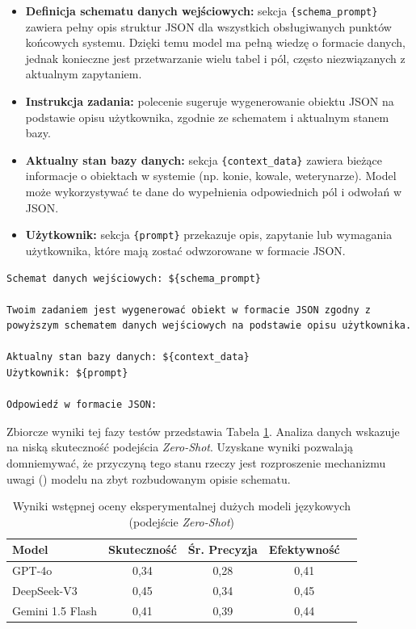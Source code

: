 \begin{itemize}
    \item \textbf{Definicja schematu danych wejściowych:} sekcja \texttt{\{schema\_prompt\}} zawiera pełny opis struktur JSON dla wszystkich obsługiwanych punktów końcowych systemu. Dzięki temu model ma pełną wiedzę o formacie danych, jednak konieczne jest przetwarzanie wielu tabel i pól, często niezwiązanych z aktualnym zapytaniem.
    \item \textbf{Instrukcja zadania:} polecenie sugeruje wygenerowanie obiektu JSON na podstawie opisu użytkownika, zgodnie ze schematem i aktualnym stanem bazy.
    \item \textbf{Aktualny stan bazy danych:} sekcja \texttt{\{context\_data\}} zawiera bieżące informacje o obiektach w systemie (np. konie, kowale, weterynarze). Model może wykorzystywać te dane do wypełnienia odpowiednich pól i odwołań w JSON.
    \item \textbf{Użytkownik:} sekcja \texttt{\{prompt\}} przekazuje opis, zapytanie lub wymagania użytkownika, które mają zostać odwzorowane w formacie JSON.
\end{itemize}

\begin{lstlisting}[caption={Struktura pierwotnego zapytania zawierająca pełny schemat bazy danych.}, label={wyk:prompt_first}]
Schemat danych wejściowych: ${schema_prompt}

Twoim zadaniem jest wygenerować obiekt w formacie JSON zgodny z powyższym schematem danych wejściowych na podstawie opisu użytkownika.

Aktualny stan bazy danych: ${context_data}
Użytkownik: ${prompt}

Odpowiedź w formacie JSON:
\end{lstlisting}


Zbiorcze wyniki tej fazy testów przedstawia Tabela \ref{tab:llm_comparison1}. Analiza danych wskazuje na niską skuteczność podejścia \textit{Zero-Shot}. Uzyskane wyniki pozwalają domniemywać, że przyczyną tego stanu rzeczy jest rozproszenie mechanizmu uwagi () modelu na zbyt rozbudowanym opisie schematu.

\begin{table}[H]
\centering
	\caption{Wyniki wstępnej oceny eksperymentalnej dużych modeli językowych (podejście \textit{Zero-Shot})}
\label{tab:llm_comparison1}
\begin{tabular}{|l|c|c|c|c|}
\hline
\textbf{Model} & \textbf{Skuteczność} & \textbf{Śr. Precyzja} & \textbf{Efektywność} \\ \hline
GPT-4o         & 0,34                 & 0,28                  & 0,41                 \\ \hline
DeepSeek-V3    & 0,45                 & 0,34                  & 0,45                 \\ \hline
Gemini 1.5 Flash & 0,41               & 0,39                  & 0,44                 \\ \hline
\end{tabular}
\end{table}

